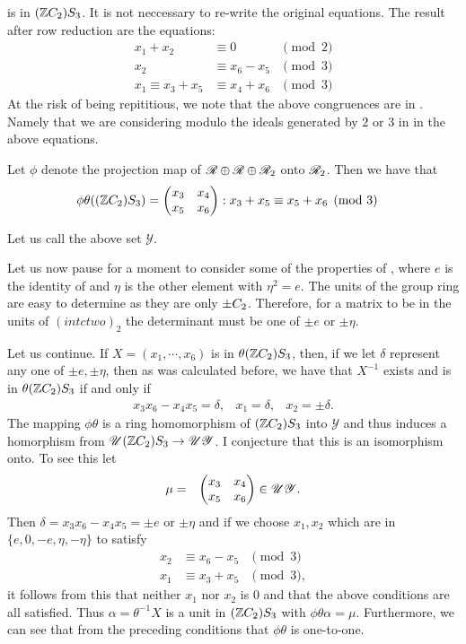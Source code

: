 \documentclass[11pt]{report}
\begin{document}
is in $( \mathbb{Z}C_2)S_3$. It is not neccessary to re-write the original 
equations. The result after row
reduction are the equations:
\begin{align*}
x_1+ x_2 & \equiv 0 & \pmod{2}\\
x_2 & \equiv x_6-x_5 & \pmod{3}\\
x_1\equiv x_3+x_5 & \equiv x_4+x_6 & \pmod{3}
\end{align*}
At the risk of being repititious, we note that the above 
congruences are in \intctwo.
Namely that we are considering modulo the ideals generated by $2$ 
or $3$ in \intctwo in the above
equations.

Let $\phi$ denote the projection map of $\mathscr{R}\oplus\mathscr{R}\oplus\mathscr{R}_2$ onto $\mathscr{R}_2$.
 Then we have that
\begin{align*}
\phi \theta(( \mathbb{Z}C_2)S_3) = 
\begin{pmatrix}    
x_3&x_4\\
x_5&x_6
\end{pmatrix} : x_3+x_5&\equiv x_5+x_6\pmod{3}
\end{align*}

Let us call the above set $\mathscr{Y}$.

Let us now pause for a moment to consider some of the properties 
of \intctwo, where $e$ is
the identity of \ctwo{} and $\eta$ is the other element with $\eta^2=e$. The 
units of the group ring \intctwo{} are
easy to determine as they are only $\pm C_2$. Therefore, for a matrix 
to be in the units of $(intctwo)_2$
the determinant must be one of $\pm e$ or $\pm \eta$.

Let us continue. If $X= (x_1,\cdots,x_6)$ is in $\theta( \mathbb{Z}C_2)S_3$, then, if we 
let $\delta$ represent any one of
$\pm e, \pm \eta$, then as was calculated before, we have that $X^{-1}$ exists 
and is in  $\theta( \mathbb{Z}C_2)S_3$ if and only if
\begin{align*}
x_3x_6-x_4x_5=\delta, &x_1=\delta, &x_2= \pm\delta.
\end{align*}
The mapping $\phi\theta$ is a ring homomorphism of $( \mathbb{Z}C_2)S_3$ into $\mathscr{Y}$
 and thus induces a homorphism from $\mathscr{U}{( \mathbb{Z}C_2)S_3}\rightarrow\mathscr{U}{\mathscr{Y}}$. 
I conjecture that this is an isomorphism onto. To see this let
\begin{align*}
\mu&=&\begin{pmatrix}
x_3&x_4\\
x_5&x_6
\end{pmatrix} 
\in \mathscr{U}{\mathscr{Y}}.
\end{align*}
Then $\delta =x_3x_6-x_4x_5=\pm e$ or $\pm \eta$  and if we choose 
$x_1,x_2$ which are in $\{e, 0, -e, \eta, -\eta\}$ to satisfy
\begin{align*}
x_2&\equiv x_6 - x_5&\pmod{3}\\
x_1&\equiv x_3+x_5&\pmod{3},
\end{align*}
it follows from this that neither $x_1$ nor $x_2$ is 0 and that the 
above conditions are all satisfied.
Thus $\alpha=\theta^{-1}X$ is a unit in $( \mathbb{Z}C_2)S_3$ with 
$\phi\theta\alpha=\mu$. Furthermore, we can 
see that from the
preceding conditions that $\phi\theta$ is one-to-one.
\end{document}
